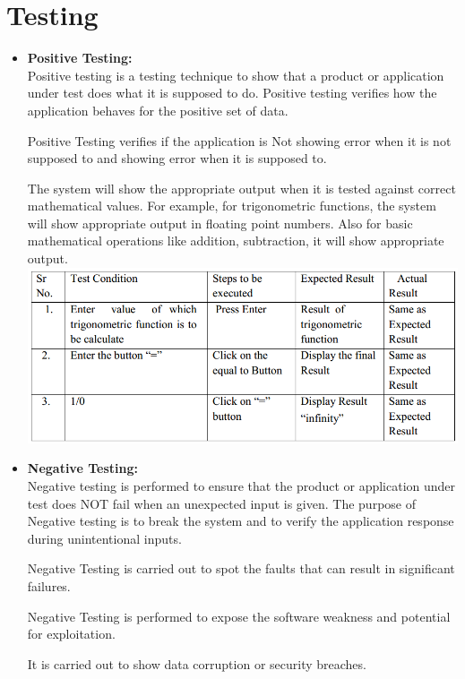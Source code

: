 \documentclass[10pt,a4paper]{article}
\begin{document}
\section{Testing}
\begin{itemize}
\item \textbf{Positive Testing:}\\
Positive testing is a testing technique to show that a product or application under test does what it is supposed to do. Positive testing verifies how the application behaves for the positive set of data.

Positive Testing verifies if the application is Not showing error when it is not supposed to and showing error when it is supposed to.

The system will show the appropriate output when it is tested against correct mathematical values. For example, for trigonometric functions, the system will show appropriate output in floating point numbers. Also for basic mathematical operations like addition, subtraction, it will show appropriate output.\\
\includegraphics[width=\textwidth]{trig_positive}
\\

\item \textbf{Negative Testing:}\\
Negative testing is performed to ensure that the product or application under test does NOT fail when an unexpected input is given. The purpose of Negative testing is to break the system and to verify the application response during unintentional inputs.

Negative Testing is carried out to spot the faults that can result in significant failures.

Negative Testing is performed to expose the software weakness and potential for exploitation.

It is carried out to show data corruption or security breaches.


\end{itemize}
\end{document}
